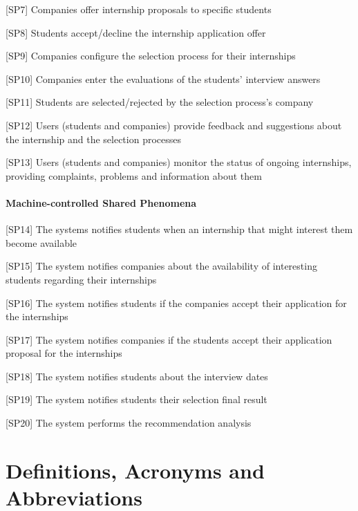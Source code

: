 					[SP7] Companies offer internship proposals to specific students
					
					[SP8] Students accept/decline the internship application offer
					
					[SP9] Companies configure the selection process for their internships
					
					[SP10] Companies enter the evaluations of the students' interview answers
					
					[SP11] Students are selected/rejected by the selection process's company 
					
					[SP12] Users (students and companies) provide feedback and suggestions about the internship and the selection processes
					
					[SP13] Users (students and companies) monitor the status of ongoing internships, providing complaints, problems and information about them
				\paragraph{Machine-controlled Shared Phenomena}
					[SP14] The systems notifies students when an internship that might interest them become available
					
					[SP15] The system notifies companies about the availability of interesting students regarding their internships
					
					[SP16] The system notifies students if the companies accept their application for the internships
					
					[SP17] The system notifies companies if the students accept their application proposal for the internships
					
					[SP18] The system notifies students about the interview dates
					
					[SP19] The system notifies students their selection final result
					
					[SP20] The system performs the recommendation analysis 
					
	\section{Definitions, Acronyms and Abbreviations}
